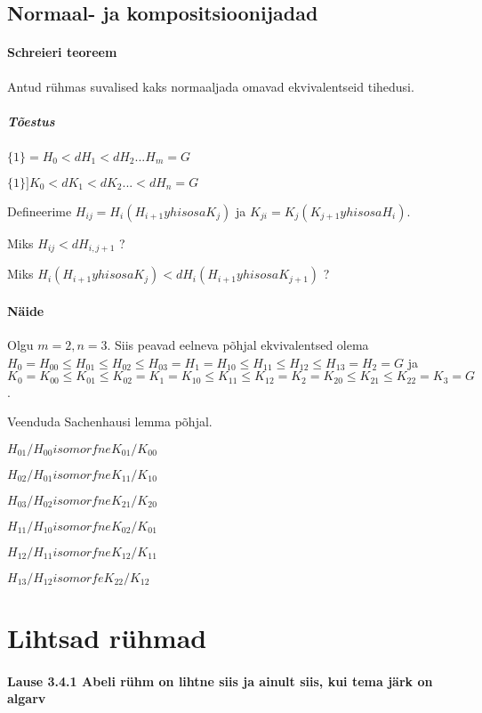 \documentclass[12pt]{report}
\numberwithin{equation}{section}
\theoremstyle{definition}
\theoremstyle{plain}
\begin{document}
\subsection{Normaal- ja kompositsioonijadad}

\paragraph{Schreieri teoreem} Antud r\"uhmas suvalised kaks normaaljada omavad ekvivalentseid tihedusi.

\subparagraph{Tõestus}
$\{1\} = H_0 <d H_1 <d H_2 ... H_m= G$

$\{1\}] K_0 <d K_1 <d K_2 ... <d H_n = G$

Defineerime $H_{ij} = H_i(H_{i+1} yhisosa K_j)$ ja $K_{ji} = K_j (K_{j+1} yhisosa H_i)$. 


Miks $H_{ij} <d H_{i,j+1}$ ?


Miks $H_i( H_{i+1} yhisosa K_j) <d H_i(H_{i+1} yhisosa K_{j+1})$ ?

\paragraph{Näide}

Olgu $ m=2, n =3$. Siis peavad eelneva põhjal ekvivalentsed olema $H_0 = H_{00} \leq H_{01} \leq H_{02} \leq H_{03} = H_1=H_{10} \leq H_{11} \leq H_{12} \leq H_{13} = H_2 = G$ ja $K_0 = K_{00} \leq K_{01} \leq K_{02} = K_1 = K_{10} \leq K_{11} \leq K_{12} = K_{2} = K_{20} \leq K_{21} \leq K_{22} = K_3 = G$.

Veenduda Sachenhausi lemma põhjal. 

$H_{01} / H_{00} isomorfne K_{01} / K_{00}$

$H_{02}/ H_{01} isomorfne K_{11}/K_{10}$

$H_{03}/ H_{02} isomorfne K_{21}/K_{20}$

$H_{11} / H_{10} isomorfne K_{02}/K_{01}$

$H_{12} / H_{11} isomorfne K_{12}/K_{11}$

$H_{13} / H_{12} isomorfe K_{22}/K_{12}$

\section{Lihtsad r\"uhmad}

\paragraph{Lause 3.4.1 Abeli rühm on lihtne siis ja ainult siis, kui tema järk on algarv}
\end{document}
